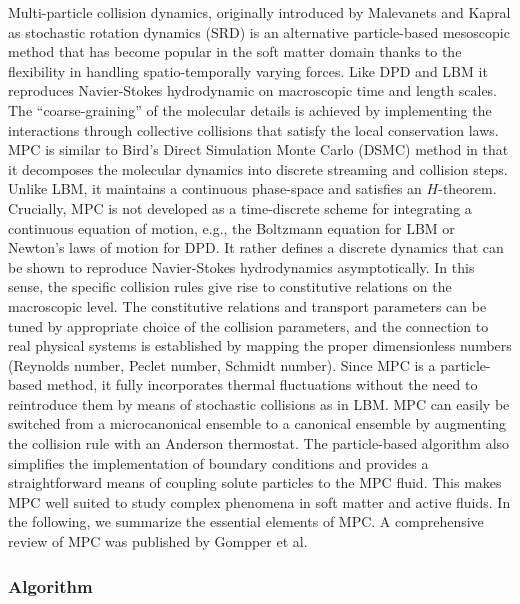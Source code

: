 \documentclass[8.5pt,twoside,twocolumn]{article}
\begin{document}
Multi-particle collision dynamics, originally introduced by Malevanets and Kapral\cite{Malevanets:1999,Malevanets:2001:Gompper2009} as stochastic rotation dynamics (SRD) is an alternative particle-based mesoscopic method that has become popular in the soft matter domain thanks to the flexibility in handling spatio-temporally varying forces. Like DPD and LBM it reproduces Navier-Stokes hydrodynamic on macroscopic time and length scales. The ``coarse-graining'' of the molecular details is achieved by implementing the interactions through collective collisions that satisfy the local conservation laws. MPC is similar to Bird's Direct Simulation Monte Carlo (DSMC) method \cite{Bird:1994} in that it decomposes the molecular dynamics into discrete streaming and collision steps. Unlike LBM, it maintains a continuous phase-space and satisfies an $H$-theorem.\cite{Malevanets:1999,Ihle:2003} Crucially, MPC is not developed as a time-discrete scheme for integrating a continuous equation of motion, e.g., the Boltzmann equation for LBM or Newton's laws of motion for DPD. It rather defines a discrete dynamics that can be shown to reproduce Navier-Stokes hydrodynamics asymptotically. In this sense, the specific collision rules give rise to constitutive relations on the macroscopic level. The constitutive relations and transport parameters can be tuned by appropriate choice of the collision parameters, and the connection to real physical systems is established by mapping the proper dimensionless numbers (Reynolds number, Peclet number, Schmidt number).\cite{Padding:2006} Since MPC is a particle-based method, it fully incorporates thermal fluctuations without the need to reintroduce them by means of stochastic collisions as in LBM.\cite{Ladd:1994a,Adhikari:2005,Duenweg:2007,Duenweg:2008a,Gross:2010} MPC can easily be switched from a microcanonical ensemble to a canonical ensemble by augmenting the collision rule with an Anderson thermostat. The particle-based algorithm also simplifies the implementation of boundary conditions and provides a straightforward means of coupling solute particles to the MPC fluid. This makes MPC well suited to study complex phenomena in soft matter and active fluids.
%
In the following, we summarize the essential elements of MPC. A comprehensive review of MPC was published by Gompper et al.\cite{Gompper:2009}

\subsubsection{Algorithm}
\end{document}
